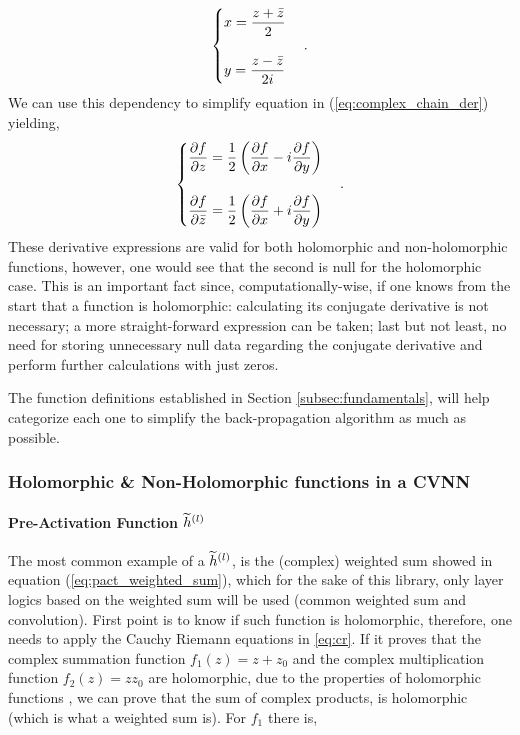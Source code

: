 \begin{equation}
	\begin{cases}
		x = \dfrac{z + \bar{z}}{2} \\
		\\
		y = \dfrac{z - \bar{z}}{2i}
	\end{cases}.
	\label{eq:xydepz}
\end{equation}
We can use this dependency to simplify equation in (\ref{eq:complex_chain_der}) yielding,
\begin{equation}
	\begin{cases}
		\dfrac{\partial f}{\partial z} = \dfrac{1}{2} \left( \dfrac{\partial f}{\partial x} - i\dfrac{\partial f}{\partial y} \right) \\
		\\
		\dfrac{\partial f}{\partial \bar{z}} = \dfrac{1}{2} \left( \dfrac{\partial f}{\partial x} + i\dfrac{\partial f}{\partial y} \right)
	\end{cases}.
	\label{eq:complex_chain_der_simp}
\end{equation}
These derivative expressions are valid for both holomorphic and non-holomorphic functions, however, one would see that the second is null for the holomorphic case. This is an important fact since, computationally-wise, if one knows from the start that a function is holomorphic: calculating its conjugate derivative is not necessary; a more straight-forward expression can be taken; last but not least, no need for storing unnecessary null data regarding the conjugate derivative and perform further calculations with just zeros.

The function definitions established in Section \ref{subsec:fundamentals}, will help categorize each one to simplify the back-propagation algorithm as much as possible.

\subsubsection{Holomorphic \& Non-Holomorphic functions in a \gls{CVNN}}
\label{subsubsec:holo_non_holo}
\paragraph{Pre-Activation Function $ \widetilde{h}^{(l)} $} 
The most common example of a $ \widetilde{h}^{(l)} $, is the (complex) weighted sum showed in equation (\ref{eq:pact_weighted_sum}), which for the sake of this library, only layer logics based on the weighted sum will be used (common weighted sum and convolution). First point is to know if such function is holomorphic, therefore, one needs to apply the Cauchy Riemann equations in \ref{eq:cr}. If it proves that the complex summation function $ f_1(z) = z + z_0 $ and the complex multiplication function $ f_2(z) = z z_0 $ are holomorphic, due to the properties of holomorphic functions \parencite{wirtinger1927formalen}, we can prove that the sum of complex products, is holomorphic (which is what a weighted sum is). For $ f_1 $ there is,

